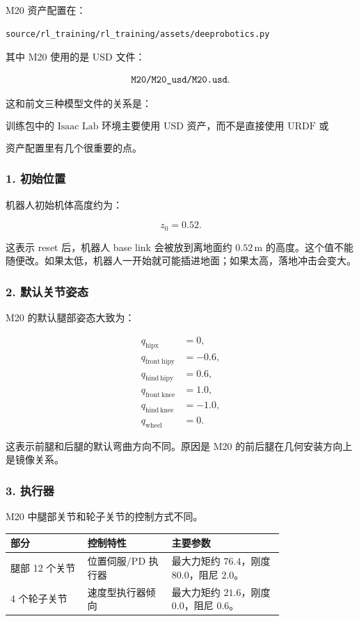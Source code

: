 \documentclass[UTF8,11pt,a4paper]{ctexart}
\begin{document}
M20 资产配置在：

\begin{verbatim}
source/rl_training/rl_training/assets/deeprobotics.py
\end{verbatim}

其中 M20 使用的是 USD 文件：

\[
\text{\texttt{M20/M20\_usd/M20.usd}}.
\]

这和前文三种模型文件的关系是：

\[
\boxed{
\text{训练包中的 Isaac Lab 环境主要使用 USD 资产，而不是直接使用 URDF 或 MJCF。}
}
\]

资产配置里有几个很重要的点。

\subsubsection{1. 初始位置}

机器人初始机体高度约为：

\[
z_0 = 0.52.
\]

这表示 reset 后，机器人 base link 会被放到离地面约 \(0.52\,\mathrm m\) 的高度。这个值不能随便改。如果太低，机器人一开始就可能插进地面；如果太高，落地冲击会变大。

\subsubsection{2. 默认关节姿态}

M20 的默认腿部姿态大致为：

\[
\begin{aligned}
q_{\mathrm{hipx}} &= 0,\\
q_{\mathrm{front\ hipy}} &= -0.6,\\
q_{\mathrm{hind\ hipy}} &= 0.6,\\
q_{\mathrm{front\ knee}} &= 1.0,\\
q_{\mathrm{hind\ knee}} &= -1.0,\\
q_{\mathrm{wheel}} &= 0.
\end{aligned}
\]

这表示前腿和后腿的默认弯曲方向不同。原因是 M20 的前后腿在几何安装方向上是镜像关系。

\subsubsection{3. 执行器}

M20 中腿部关节和轮子关节的控制方式不同。

\begin{center}
\begin{tabular}{p{0.22\linewidth}p{0.24\linewidth}p{0.32\linewidth}}
\toprule
部分 & 控制特性 & 主要参数 \\
\midrule
腿部 12 个关节 & 位置伺服/PD 执行器 & 最大力矩约 \(76.4\)，刚度 \(80.0\)，阻尼 \(2.0\)。\\
4 个轮子关节 & 速度型执行器倾向 & 最大力矩约 \(21.6\)，刚度 \(0.0\)，阻尼 \(0.6\)。\\
\bottomrule
\end{tabular}
\end{center}
\end{document}

